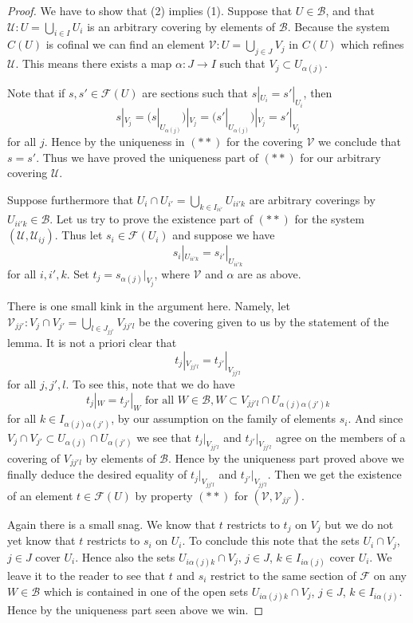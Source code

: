 \begin{proof}
We have to show that (2) implies (1).
Suppose that $U \in \mathcal{B}$, and that
$\mathcal{U} : U = \bigcup_{i\in I} U_i$ is an arbitrary covering
by elements of $\mathcal{B}$.  Because the system $C(U)$ is cofinal
we can find an element $\mathcal{V} : U = \bigcup_{j \in J} V_j$
in $C(U)$ which refines $\mathcal{U}$. This means there exists
a map $\alpha : J \to I$ such that $V_j \subset U_{\alpha(j)}$.

\medskip\noindent
Note that if $s, s' \in \mathcal{F}(U)$ are sections such
that $s|_{U_i} = s'|_{U_i}$, then
$$
s|_{V_j}
= (s|_{U_{\alpha(j)}})|_{V_j}
= (s'|_{U_{\alpha(j)}})|_{V_j}
= s'|_{V_j}
$$
for all $j$. Hence by the uniqueness in $(**)$
for the covering $\mathcal{V}$ we conclude that $s = s'$.
Thus we have proved the uniqueness part of $(**)$
for our arbitrary covering $\mathcal{U}$.

\medskip\noindent
Suppose furthermore that $U_i \cap U_{i'} = \bigcup_{k \in I_{ii'}} U_{ii'k}$
are arbitrary coverings by $U_{ii'k} \in \mathcal{B}$.
Let us try to prove the existence part of $(**)$ for the system
$(\mathcal{U}, \mathcal{U}_{ij})$. Thus let $s_i \in \mathcal{F}(U_i)$
and suppose we have
$$
s_i|_{U_{ii'k}} = s_{i'}|_{U_{ii'k}}
$$
for all $i, i', k$. Set $t_j = s_{\alpha(j)}|_{V_j}$, where $\mathcal{V}$
and $\alpha$ are as above.

\medskip\noindent
There is one small kink in the argument here. Namely, let
$\mathcal{V}_{jj'} : V_j \cap V_{j'} = \bigcup_{l \in J_{jj'}} V_{jj'l}$
be the covering given to us by the statement of the lemma.
It is not a priori clear that
$$
t_j|_{V_{jj'l}} = t_{j'}|_{V_{jj'l}}
$$
for all $j, j', l$. To see this, note that we do have
$$
t_j|_W = t_{j'}|_W \text{ for all } W \in \mathcal{B},
W \subset V_{jj'l} \cap U_{\alpha(j)\alpha(j')k}
$$
for all $k \in I_{\alpha(j)\alpha(j')}$, by our assumption on
the family of elements $s_i$. And since
$V_j \cap V_{j'} \subset U_{\alpha(j)} \cap U_{\alpha(j')}$
we see that $t_j|_{V_{jj'l}}$ and $t_{j'}|_{V_{jj'l}}$
agree on the members of a covering of $V_{jj'l}$ by
elements of $\mathcal{B}$. Hence by the uniqueness part proved above
we finally deduce the desired equality of
$t_j|_{V_{jj'l}}$ and $t_{j'}|_{V_{jj'l}}$.
Then we get the existence of an element $t \in \mathcal{F}(U)$
by property $(**)$ for $(\mathcal{V}, \mathcal{V}_{jj'})$.

\medskip\noindent
Again there is a small snag. We know that $t$ restricts to $t_j$ on $V_j$
but we do not yet know that $t$ restricts to $s_i$ on $U_i$. To conclude
this note that the sets $U_i \cap V_j$, $j \in J$ cover $U_i$. Hence
also the sets $U_{i \alpha(j) k} \cap V_j$, $j\in J$, $k \in I_{i\alpha(j)}$
cover $U_i$. We leave it to the reader to see that $t$ and $s_i$ restrict
to the same section of $\mathcal{F}$ on any $W \in \mathcal{B}$
which is contained in one of the open sets
$U_{i \alpha(j) k} \cap V_j$, $j\in J$, $k \in I_{i\alpha(j)}$.
Hence by the uniqueness part seen above we win.
\end{proof}

